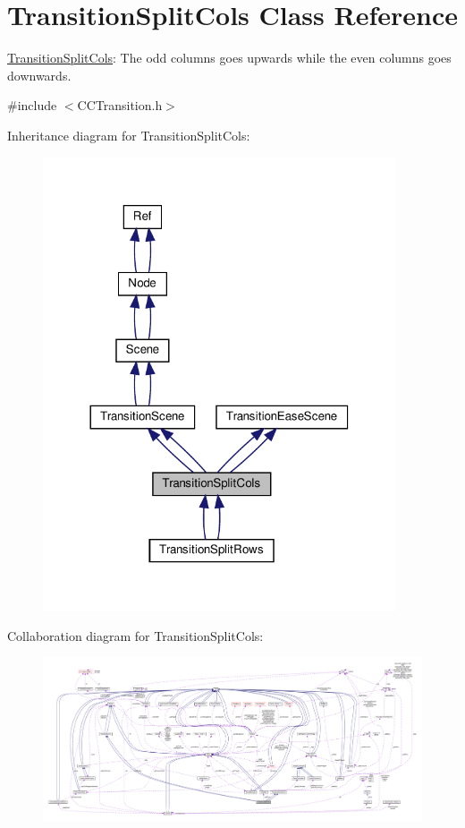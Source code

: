 \hypertarget{classTransitionSplitCols}{}\section{Transition\+Split\+Cols Class Reference}
\label{classTransitionSplitCols}


\hyperlink{classTransitionSplitCols}{Transition\+Split\+Cols}\+: The odd columns goes upwards while the even columns goes downwards.  




{\ttfamily \#include $<$C\+C\+Transition.\+h$>$}



Inheritance diagram for Transition\+Split\+Cols\+:
\nopagebreak
\begin{figure}[H]
\begin{center}
\leavevmode
\includegraphics[width=296pt]{classTransitionSplitCols__inherit__graph}
\end{center}
\end{figure}


Collaboration diagram for Transition\+Split\+Cols\+:
\nopagebreak
\begin{figure}[H]
\begin{center}
\leavevmode
\includegraphics[width=350pt]{classTransitionSplitCols__coll__graph}
\end{center}
\end{figure}

